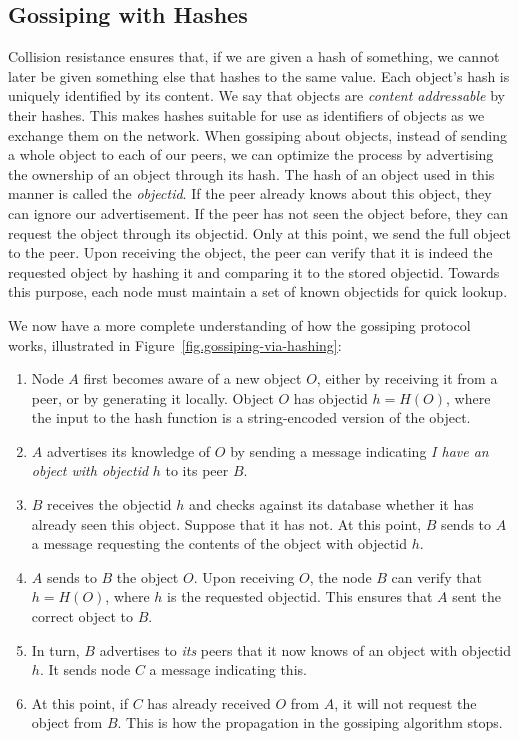 \subsection*{Gossiping with Hashes}

Collision resistance ensures that, if we are given a hash of something, we cannot
later be given something else that hashes to the same value. Each object's hash
is uniquely identified by its content. We say that objects are
\emph{content addressable}
by their hashes.
This makes hashes suitable
for use as identifiers of objects as we exchange them on the network. When gossiping
about objects, instead of sending a whole object to each of our peers, we can optimize
the process by advertising the ownership of an object through its hash. The hash of
an object used in this manner is called the \emph{objectid}. If the peer already knows
about this object, they can ignore our advertisement. If the peer has not seen the
object before, they can request the object through its objectid. Only at this point, we
send the full object to the peer. Upon receiving the object, the peer can verify that
it is indeed the requested object by hashing it and comparing it to the stored objectid.
Towards this purpose, each node must maintain a set of known objectids for quick lookup.

We now have a more complete understanding of how the gossiping protocol works,
illustrated in Figure~\ref{fig.gossiping-via-hashing}:

\begin{enumerate}
  \item Node $A$ first becomes aware of a new object $O$, either by receiving it from a peer,
        or by generating it locally. Object $O$ has objectid $h = H(O)$, where the input to the
        hash function is a string-encoded version of the object.
  \item $A$ advertises its knowledge of $O$ by sending a message
        indicating \emph{I have an object with objectid} $h$ to its peer $B$.
  \item $B$ receives the objectid $h$ and checks against its database whether it has already seen
        this object. Suppose that it has not. At this point, $B$ sends to $A$ a message
        requesting the contents of the object with objectid $h$.
  \item $A$ sends to $B$ the object $O$. Upon receiving $O$, the node $B$ can verify that
        $h = H(O)$, where $h$ is the requested objectid. This ensures that $A$ sent the
        correct object to $B$.
  \item In turn, $B$ advertises to \emph{its} peers that it now knows of an object with
        objectid $h$. It sends node $C$ a message indicating this.
  \item At this point, if $C$ has already received $O$ from $A$, it will not request
        the object from $B$. This is how the propagation in the gossiping algorithm stops.
\end{enumerate}

